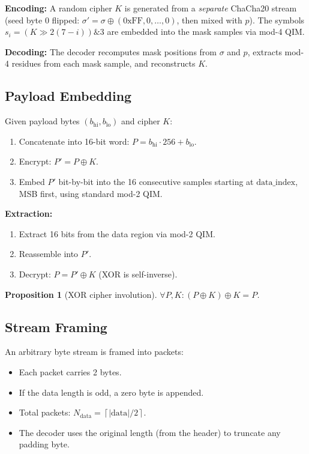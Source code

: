 \documentclass[11pt,a4paper]{article}
\newtheorem{proposition}[theorem]{Proposition}
\newcommand{\xor}{\oplus}
\newcommand{\ceil}[1]{\left\lceil #1 \right\rceil}
\begin{document}
\textbf{Encoding:}
A random cipher $K$ is generated from a \emph{separate} ChaCha20 stream
(seed byte 0 flipped: $\sigma' = \sigma \xor (0\text{xFF}, 0, \ldots, 0)$,
then mixed with $p$).  The symbols $s_i = (K \gg 2(7-i)) \mathbin{\&} 3$
are embedded into the mask samples via mod-4 QIM.

\textbf{Decoding:}
The decoder recomputes mask positions from $\sigma$ and $p$, extracts
mod-4 residues from each mask sample, and reconstructs $K$.

\subsection{Payload Embedding}

Given payload bytes $(b_\mathrm{hi}, b_\mathrm{lo})$ and cipher $K$:
\begin{enumerate}
    \item Concatenate into 16-bit word: $P = b_\mathrm{hi} \cdot 256 + b_\mathrm{lo}$.
    \item Encrypt: $P' = P \xor K$.
    \item Embed $P'$ bit-by-bit into the 16 consecutive samples starting
          at $\mathrm{data\_index}$, MSB first, using standard mod-2 QIM.
\end{enumerate}

\textbf{Extraction:}
\begin{enumerate}
    \item Extract 16 bits from the data region via mod-2 QIM.
    \item Reassemble into $P'$.
    \item Decrypt: $P = P' \xor K$ (XOR is self-inverse).
\end{enumerate}

\begin{proposition}[XOR cipher involution]
$\forall P, K: (P \xor K) \xor K = P$.
\end{proposition}

\subsection{Stream Framing}

An arbitrary byte stream is framed into packets:
\begin{itemize}
    \item Each packet carries 2 bytes.
    \item If the data length is odd, a zero byte is appended.
    \item Total packets: $N_\text{data} = \ceil{|\text{data}| / 2}$.
    \item The decoder uses the original length (from the header) to
          truncate any padding byte.
\end{itemize}
\end{document}
